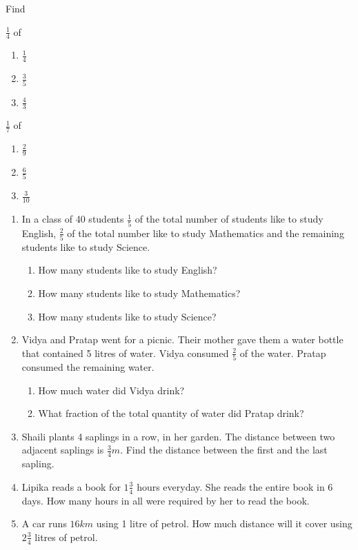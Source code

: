 Find
\begin{enumerate}[label=\thesection.\arabic*,ref=\thesection.\theenumi,resume*,itemsep=1ex]
	\begin{multicols}{2}
	\item $\frac{1}{4}$ of
		\begin{enumerate}
			\item $\frac{1}{4}$
			\item $\frac{3}{5}$
			\item $\frac{4}{3}$
		\end{enumerate}
	\item $\frac{1}{7}$ of
		\begin{enumerate}
			\item $\frac{2}{9}$
			\item $\frac{6}{5}$
			\item $\frac{3}{10}$
		\end{enumerate}
	\end{multicols}
\end{enumerate}
\begin{enumerate}[label=\thesection.\arabic*,ref=\thesection.\theenumi,resume*]
	\item  In a class of 40 students $\frac{1}{5}$ of the total number of students like to study English, 
$\frac{2}{5}$ of the total number like to study Mathematics and the remaining students like to study Science.
\begin{enumerate}
	\item How many students like to study English?
	\item How many students like to study Mathematics?
	\item How many students like to study Science?
\end{enumerate}
\item Vidya and Pratap went for a picnic.  Their mother gave them a water bottle that contained 5 litres of water.  Vidya consumed $\frac{2}{5}$ of the water.  Pratap consumed the remaining water.
	\begin{enumerate}
		\item How much water did Vidya drink?
		\item What fraction of the total quantity of water did Pratap drink?
	\end{enumerate}
\item Shaili plants 4 saplings in a row, in her garden.  The distance between two adjacent saplings is $\frac{3}{4}m$. Find the distance between the first and the last sapling.
\item Lipika reads a book for $1\frac{3}{4}$ hours everyday.  She reads the entire book in 6 days.  How many hours in all were required by her to read the book.
\item A car runs $16km$ using 1 litre of petrol.  How much distance will it cover using $2\frac{3}{4}$ litres of petrol.
\end{enumerate}
